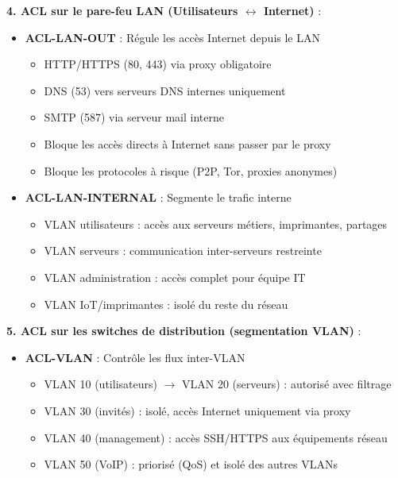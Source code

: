 \noindent \textbf{4. ACL sur le pare-feu LAN (Utilisateurs $\leftrightarrow$ Internet)} :\\
\begin{itemize}
  \item \textbf{ACL-LAN-OUT} : Régule les accès Internet depuis le LAN
  \begin{itemize}
    \item HTTP/HTTPS (80, 443) via proxy obligatoire
    \item DNS (53) vers serveurs DNS internes uniquement
    \item SMTP (587) via serveur mail interne
    \item Bloque les accès directs à Internet sans passer par le proxy
    \item Bloque les protocoles à risque (P2P, Tor, proxies anonymes)
  \end{itemize}

  \newpage
  
  \item \textbf{ACL-LAN-INTERNAL} : Segmente le trafic interne
  \begin{itemize}
    \item VLAN utilisateurs : accès aux serveurs métiers, imprimantes, partages
    \item VLAN serveurs : communication inter-serveurs restreinte
    \item VLAN administration : accès complet pour équipe IT
    \item VLAN IoT/imprimantes : isolé du reste du réseau
  \end{itemize}
\end{itemize}

\medskip

\noindent \textbf{5. ACL sur les switches de distribution (segmentation VLAN)} :\\
\begin{itemize}
  \item \textbf{ACL-VLAN} : Contrôle les flux inter-VLAN
  \begin{itemize}
    \item VLAN 10 (utilisateurs) $\rightarrow$ VLAN 20 (serveurs) : autorisé avec filtrage
    \item VLAN 30 (invités) : isolé, accès Internet uniquement via proxy
    \item VLAN 40 (management) : accès SSH/HTTPS aux équipements réseau
    \item VLAN 50 (VoIP) : priorisé (QoS) et isolé des autres VLANs
  \end{itemize}
\end{itemize}

